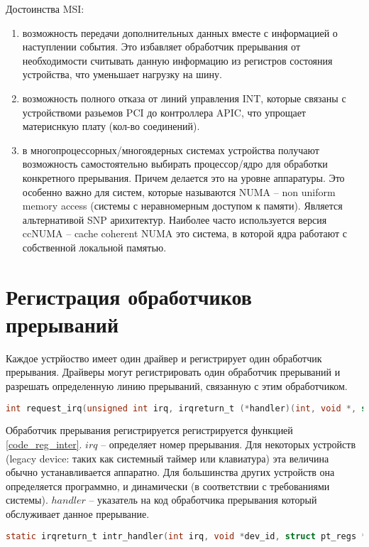 Достоинства MSI:
\begin{enumerate}
	\item возможность передачи дополнительных данных вместе с информацией о наступлении события. Это избавляет обработчик прерывания от необходимости считывать данную информацию из регистров состояния устройства, что уменьшает нагрузку на шину.
	\item возможность полного отказа от линий управления INT, которые связаны с устройствоми разьемов  PCI до контроллера APIC, что упрощает материснкую плату (кол-во соединений).
	\item в многопроцессорных/многоядерных системах устройства получают возможность самостоятельно выбирать процессор/ядро для обработки конкретного прерывания. Причем делается это на уровне аппаратуры. Это особенно важно для систем, которые называются NUMA – non uniform memory access (системы с неравномерным доступом к памяти). Является альтернативой SNP арихитектур. Наиболее часто используется версия ccNUMA – cache coherent NUMA это система, в которой ядра работают с собственной локальной памятью.
\end{enumerate}	

\section{Регистрация обработчиков прерываний}

Каждое устрйоство имеет один драйвер и регистрирует один обработчик прерывания. Драйверы могут регистрировать один обработчик прерываний и разрешать определенную линию прерываний, связанную с этим обработчиком. 

\begin{lstlisting}[language=c, caption=listing, label=code_reg_inter]
int request_irq(unsigned int irq, irqreturn_t (*handler)(int, void *, struct pr_regs *), unsigned long irqflags, const char *devname, void *dev_id) 
\end{lstlisting}

Обработчик прерывания регистрируется регистрируется функцией \ref{code_reg_inter}.
$irq$ – определяет номер прерывания. Для некоторых устройств (legacy device: таких как системный таймер или клавиатура) эта величина обычно устанавливается аппаратно. Для большинства других устройств она определяется программно, и динамически (в соответствии с требованиями системы). 
$handler$ – указатель на код обработчика прерывания который обслуживает данное прерывание.

\begin{lstlisting}[language=c, caption=listing, label=code_work_inter]
static irqreturn_t intr_handler(int irq, void *dev_id, struct pt_regs *regs);
\end{lstlisting}

